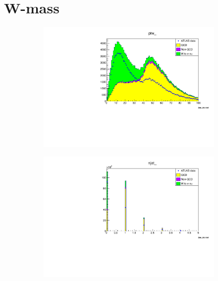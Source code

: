 \section{W-mass}

\begin{figure}
    \begin{subfigure}{0.5\textwidth}
        \includegraphics[width=\textwidth]{../W_mass/ptw_100_0_100_qcd1.pdf}
    \end{subfigure}
    \begin{subfigure}{0.5\textwidth}
        \includegraphics[width=\textwidth]{../W_mass/njet_100_0_5_qcd1.pdf}
    \end{subfigure}
    \begin{subfigure}{0.5\textwidth}

\end{subfigure}
\end{figure}
